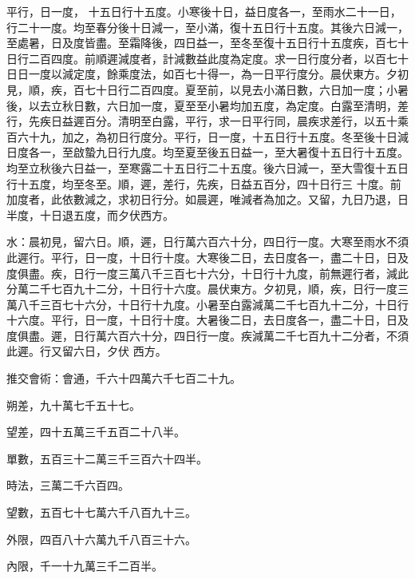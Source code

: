 \begin{pinyinscope}
 平行，日一度，
 十五日行十五度。小寒後十日，益日度各一，至雨水二十一日，行二十一度。均至春分後十日減一，至小滿，復十五日行十五度。其後六日減一，至處暑，日及度皆盡。至霜降後，四日益一，至冬至復十五日行十五度疾，百七十日行二百四度。前順遲減度者，計減數益此度為定度。求一日行度分者，以百七十日日一度以減定度，餘乘度法，如百七十得一，為一日平行度分。晨伏東方。夕初見，順，疾，百七十日行二百四度。夏至前，以見去小滿日數，六日加一度；小暑後，以去立秋日數，六日加一度，夏至至小暑均加五度，為定度。白露至清明，差行，先疾日益遲百分。清明至白露，平行，求一日平行同，晨疾求差行，以五十乘百六十九，加之，為初日行度分。平行，日一度，十五日行十五度。冬至後十日減日度各一，至啟蟄九日行九度。均至夏至後五日益一，至大暑復十五日行十五度。均至立秋後六日益一，至寒露二十五日行二十五度。後六日減一，至大雪復十五日行十五度，均至冬至。順，遲，差行，先疾，日益五百分，四十日行三
 十度。前加度者，此依數減之，求初日行分。如晨遲，唯減者為加之。又留，九日乃退，日半度，十日退五度，而夕伏西方。



 水：晨初見，留六日。順，遲，日行萬六百六十分，四日行一度。大寒至雨水不須此遲行。平行，日一度，十日行十度。大寒後二日，去日度各一，盡二十日，日及度俱盡。疾，日行一度三萬八千三百七十六分，十日行十九度，前無遲行者，減此分萬二千七百九十二分，十日行十六度。晨伏東方。夕初見，順，疾，日行一度三萬八千三百七十六分，十日行十九度。小暑至白露減萬二千七百九十二分，十日行十六度。平行，日一度，十日行十度。大暑後二日，去日度各一，盡二十日，日及度俱盡。遲，日行萬六百六十分，四日行一度。疾減萬二千七百九十二分者，不須此遲。行又留六日，夕伏
 西方。



 推交會術：會通，千六十四萬六千七百二十九。



 朔差，九十萬七千五十七。



 望差，四十五萬三千五百二十八半。



 單數，五百三十二萬三千三百六十四半。



 時法，三萬二千六百四。



 望數，五百七十七萬六千八百九十三。



 外限，四百八十六萬九千八百三十六。



 內限，千一十九萬三千二百半。




\end{pinyinscope}

